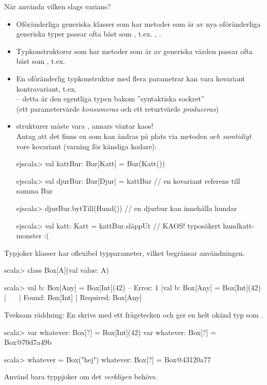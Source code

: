 \begin{Slide}{När använda vilken slags varians?}
\begin{itemize}\SlideFontSmall
\item Oföränderliga generiska klasser som har metoder som är  av nya oföränderliga generiska typer passar ofta bäst som , t.ex. ,  . 
\item Typkonstruktorer som har metoder som är  av generiska värden passar ofta bäst som , t.ex.  
\item En oföränderlig typkonstruktor med flera parametrar kan vara  kovariant  kontravariant, t.ex.  \\-- detta är den egentliga typen bakom ''syntaktiska sockret'' \\
(ett parametervärde \emph{konsumeras} och ett returtvärde \emph{produceras})
\item {} strukturer måste vara , annars väntar kaos!\\
\pause Antag att det finns en  som kan ändras på plats via metoden  \emph{och samtidigt} vore kovariant (varning för känsliga kodare): 
\begin{REPLsmall}
ejscala> val kattBur: Bur[Katt] = Bur(Katt())

ejscala> val djurBur: Bur[Djur] = kattBur  // en kovariant referens till samma Bur

ejscala> djurBur.bytTill(Hund())           // en djurbur kan innehålla hundar

ejscala> val katt: Katt = kattBur.släppUt  // KAOS! typosäkert hundkatt-monster :(
\end{REPLsmall}
\end{itemize}
\end{Slide}


\begin{Slide}{Typjoker }\SlideFontSmall
{} klasser har oflexibel typparameter, vilket begränsar användningen. %
\begin{REPL}
scala> class Box[A](val value: A)

scala> val b: Box[Any] = Box[Int](42)
-- Error:
1 |val b: Box[Any] = Box[Int](42)
  |                  ^^^^^^^^^^^^
  |                  Found:    Box[Int]
  |                  Required: Box[Any]
\end{REPL}  
Tveksam räddning: En   skrivs med ett frågetecken och ger en helt okänd typ  som .
\begin{REPL}
scala> var whatever: Box[?] = Box[Int](42)
var whatever: Box[?] = Box@70d7a49b
                                                                                    
scala> whatever = Box("hej")
whatever: Box[?] = Box@43120a77
\end{REPL}
Använd bara typpjoker om det \emph{verkligen} behövs.
\end{Slide}


